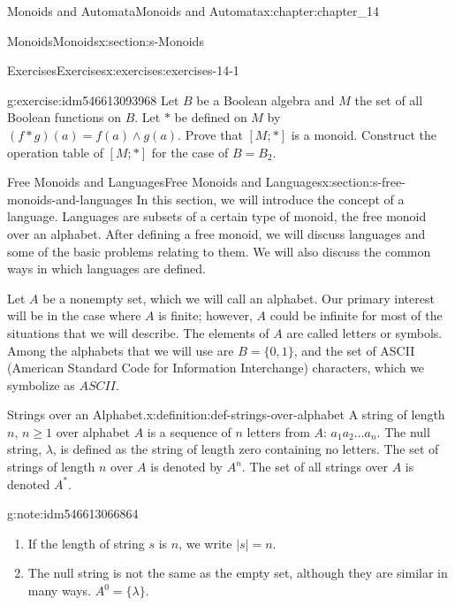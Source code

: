\documentclass[oneside,10pt,]{book}
\numberwithin{equation}{section}
\begin{document}
\begin{chapterptx}{Monoids and Automata}{}{Monoids and Automata}{}{}{x:chapter:chapter_14}
\begin{sectionptx}{Monoids}{}{Monoids}{}{}{x:section:s-Monoids}
\begin{exercises-subsection}{Exercises}{}{Exercises}{}{}{x:exercises:exercises-14-1}
\begin{divisionexercise}{5}{}{}{g:exercise:idm546613093968}
Let \(B\) be a Boolean algebra and \(M\) the set of all Boolean functions on \(B\). Let \(*\) be defined on \(M\) by \((f * g)(a) = f(a) \land  g(a)\). Prove that \([M;*]\) is a monoid. Construct the operation table of \([M;*]\) for the case of \(B = B_2\).%
\end{divisionexercise}%
\end{exercises-subsection}
\end{sectionptx}
%
%
\typeout{************************************************}
\typeout{************************************************}
%
\begin{sectionptx}{Free Monoids and Languages}{}{Free Monoids and Languages}{}{}{x:section:s-free-monoids-and-languages}
%
In this section, we will introduce the concept of a language. Languages are subsets of a certain type of monoid, the free monoid over an alphabet. After defining a free monoid, we will discuss languages and some of the basic problems relating to them. We will also discuss the common ways in which languages are defined.%
\par
Let \(A\) be a nonempty set, which we will call an alphabet. Our primary interest will be in the case where \(A\) is finite; however, \(A\) could be infinite for most of the situations that we will describe. The elements of \(A\) are called letters or symbols. Among the alphabets that we will use are \(B=\{0,1\}\), and the set of ASCII (American Standard Code for Information Interchange) characters, which we symbolize as \(ASCII\).%
\begin{definition}{Strings over an Alphabet.}{x:definition:def-strings-over-alphabet}%
%
\label{g:notation:idm546613070896}%
\label{g:notation:idm546613070320}%
\label{g:notation:idm546613067728}%
A string of length \(n\), \(n \geqslant 1\) over alphabet \(A\) is a sequence of \(n\) letters from \(A\): \(a_1a_2\ldots a_n\). The null string, \(\lambda\),  is defined as the string of length zero containing no letters. The set of strings of length \(n\) over \(A\) is denoted by \(A^n\). The set of all strings over \(A\) is denoted \(A^*\).%
\end{definition}
\begin{note}{}{g:note:idm546613066864}%
%
\begin{enumerate}[label=(\alph*)]
\item{}If the length of string \(s\) is \(n\), we write \(\lvert s \rvert =n\).%
\item{}The null string is not the same as the empty set, although they are similar in many ways.  \(A^0 = \{\lambda\}\).%

\end{enumerate}
\end{note}
\end{sectionptx}
\end{chapterptx}
\end{document}
